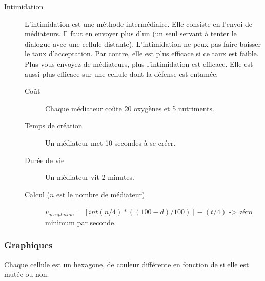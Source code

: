 \documentclass{article}
\begin{document}
\begin{description}
	\item[Intimidation]\label{intimi}
		L'intimidation est une méthode intermédiaire. Elle consiste en l'envoi de médiateurs. Il faut en envoyer plus d'un (un seul servant à tenter le dialogue avec une cellule distante). L'intimidation ne peux pas faire baisser le taux d'acceptation. Par contre, elle est plus efficace si ce taux est faible. Plus vous envoyez de médiateurs, plus l'intimidation est efficace. Elle est aussi plus efficace sur une cellule dont la défense est entamée.
		\begin{description}
			\item[Coût] Chaque médiateur coûte 20 oxygènes et 5 nutriments.
			\item[Temps de création] Un médiateur met 10 secondes à se créer.
			\item[Durée de vie] Un médiateur vit 2 minutes.
			\item[Calcul ($n$ est le nombre de médiateur)] $v_{acceptation} = [int(n/4) * ((100-d) / 100)] - (t/4)$ -> zéro minimum par seconde.
		\end{description}
\end{description}

\subsubsection{Graphiques}
Chaque cellule est un hexagone, de couleur différente en fonction de si elle est mutée ou non. %
\end{document}
